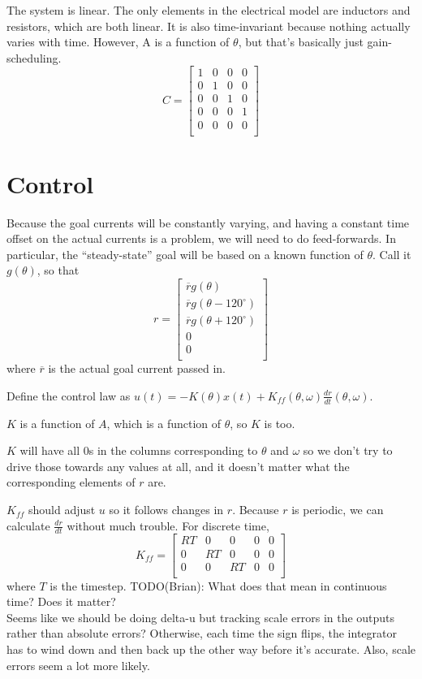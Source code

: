 \documentclass[fleqn]{article}
\begin{document}
\begin{flushleft}
The system is linear. The only elements in the electrical model are
inductors and resistors, which are both linear.
It is also time-invariant because nothing actually varies with time.
However, A is a function of $\theta$, but that's basically just gain-scheduling.
\\
\[C =
  \begin{bmatrix}
    1 & 0 & 0 & 0 \\
    0 & 1 & 0 & 0 \\
    0 & 0 & 1 & 0 \\
    0 & 0 & 0 & 1 \\
    0 & 0 & 0 & 0 \\
  \end{bmatrix}
\]

\section{Control}
Because the goal currents will be constantly varying, and having a constant
time offset on the actual currents is a problem, we will need to do
feed-forwards.
In particular, the ``steady-state'' goal will be based on a known function of
$\theta$. Call it $g(\theta)$, so that
\[r =
  \begin{bmatrix}
    \overline{r}g(\theta) \\
    \overline{r}g(\theta - 120^{\circ}) \\
    \overline{r}g(\theta + 120^{\circ}) \\
    0 \\
    0 \\
  \end{bmatrix}
\]
where $\overline{r}$ is the actual goal current passed in.

Define the control law as
$u(t) = -K(\theta)x(t) + K_{ff}(\theta, \omega)\frac{dr}{dt}(\theta, \omega)$.

$K$ is a function of $A$, which is a function of $\theta$, so $K$ is too.

$K$ will have all 0s in the columns corresponding to $\theta$ and $\omega$ so
we don't try to drive those towards any values at all, and it doesn't matter
what the corresponding elements of $r$ are.

$K_{ff}$ should adjust $u$ so it follows changes in $r$. Because $r$ is
periodic, we can calculate $\frac{dr}{dt}$ without much trouble.
For discrete time,
\[K_{ff} =
  \begin{bmatrix}
    R T & 0   & 0   & 0 & 0 \\
    0   & R T & 0   & 0 & 0 \\
    0   & 0   & R T & 0 & 0 \\
  \end{bmatrix}
\] where $T$ is the timestep.
TODO(Brian): What does that mean in continuous time? Does it matter?
\\
Seems like we should be doing delta-u but tracking scale errors in the outputs
rather than absolute errors? Otherwise, each time the sign flips, the integrator
has to wind down and then back up the other way before it's accurate. Also,
scale errors seem a lot more likely.


\end{flushleft}
\end{document}
